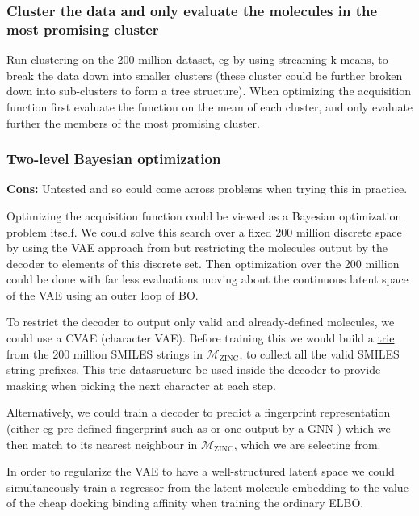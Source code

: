 \documentclass{article}
\begin{document}
\subsubsection{Cluster the data and only evaluate the molecules in the most promising cluster}

Run clustering on the 200 million dataset, eg by using streaming k-means, to break the data down into smaller
clusters (these cluster could be further broken down into sub-clusters to form a tree structure).
When optimizing the acquisition function first evaluate the function on the mean of each cluster,
and only evaluate further the members of the most promising cluster.



\subsubsection{Two-level Bayesian optimization}

\textbf{Cons:} Untested and so could come across problems when trying this in practice.

Optimizing the acquisition function could be viewed as a Bayesian optimization problem itself.
We could solve this search over a fixed 200 million discrete space by using the VAE approach from \citet{gomez2018automatic}
but restricting the molecules output by the decoder to elements of this discrete set. 
Then optimization over the 200 million could be done with far less evaluations moving about the continuous latent space
of the VAE using an outer loop of BO.

To restrict the decoder to output only valid and already-defined molecules, we could use a CVAE (character VAE).
Before training this we would build a \href{https://en.wikipedia.org/wiki/Trie}{trie} from the 200 million SMILES strings in
$\mathcal{M}_{\textrm{ZINC}}$, to collect all the valid SMILES string prefixes.
This trie datasructure be used inside the decoder to provide masking when picking the next character at each step.

Alternatively, we could train a decoder to predict a fingerprint representation
(either eg pre-defined fingerprint such as \citet{Rogers2010-tv} or one output by a GNN \citep{duvenaud2015convolutional})
which we then match to its nearest neighbour in $\mathcal{M}_{\textrm{ZINC}}$, which we are selecting from.

In order to regularize the VAE to have a well-structured latent space we could simultaneously train a regressor from the latent 
molecule embedding to the value of the cheap docking binding affinity when training the ordinary ELBO.
\end{document}
